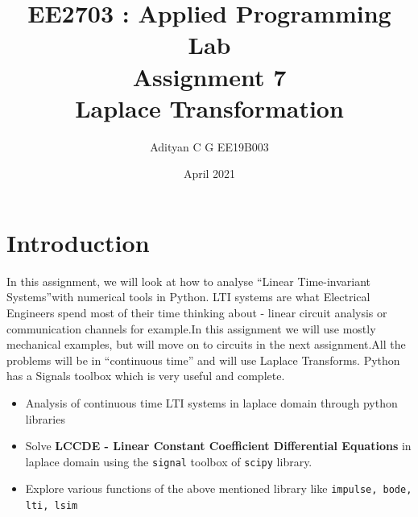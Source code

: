 \documentclass[12pt, a4paper]{report}
\begin{document}
		
\title{\textbf{EE2703 : Applied Programming Lab \\ Assignment 7 \\ Laplace Transformation}} %
\author{Adityan C G EE19B003} %
\date{April 2021} %
\maketitle %

\section*{Introduction}
In this assignment, we will look at how to analyse “Linear Time-invariant Systems”with numerical tools in Python.  LTI systems are what Electrical Engineers spend most of their time thinking about - linear circuit analysis or communication channels for example.In this assignment we will use mostly mechanical examples, but will move on to circuits in the next assignment.All the problems will be in “continuous time” and will use Laplace Transforms. Python has  a  Signals  toolbox  which  is  very  useful  and  complete.

\begin{itemize}
  	\item Analysis of continuous time LTI systems in laplace domain through python libraries
    \item Solve \textbf{LCCDE - Linear Constant Coefficient Differential Equations} in laplace  domain using the \texttt{signal} toolbox of \texttt{scipy} library.
  	\item Explore various functions of the above mentioned library like \texttt{impulse, bode, lti, lsim}
\end{itemize}
\end{document}
